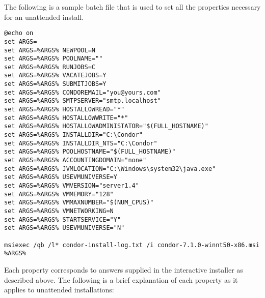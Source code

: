 The following is a sample batch file that is used to set all the
properties necessary for an unattended install.

\begin{verbatim}
@echo on
set ARGS=
set ARGS=%ARGS% NEWPOOL=N
set ARGS=%ARGS% POOLNAME=""
set ARGS=%ARGS% RUNJOBS=C
set ARGS=%ARGS% VACATEJOBS=Y
set ARGS=%ARGS% SUBMITJOBS=Y
set ARGS=%ARGS% CONDOREMAIL="you@yours.com"
set ARGS=%ARGS% SMTPSERVER="smtp.localhost"
set ARGS=%ARGS% HOSTALLOWREAD="*"
set ARGS=%ARGS% HOSTALLOWWRITE="*"
set ARGS=%ARGS% HOSTALLOWADMINISTATOR="$(FULL_HOSTNAME)"
set ARGS=%ARGS% INSTALLDIR="C:\Condor"
set ARGS=%ARGS% INSTALLDIR_NTS="C:\Condor"
set ARGS=%ARGS% POOLHOSTNAME="$(FULL_HOSTNAME)"
set ARGS=%ARGS% ACCOUNTINGDOMAIN="none"
set ARGS=%ARGS% JVMLOCATION="C:\Windows\system32\java.exe"
set ARGS=%ARGS% USEVMUNIVERSE=Y
set ARGS=%ARGS% VMVERSION="server1.4"
set ARGS=%ARGS% VMMEMORY="128"
set ARGS=%ARGS% VMMAXNUMBER="$(NUM_CPUS)"
set ARGS=%ARGS% VMNETWORKING=N
set ARGS=%ARGS% STARTSERVICE="Y"
set ARGS=%ARGS% USEVMUNIVERSE="N"

msiexec /qb /l* condor-install-log.txt /i condor-7.1.0-winnt50-x86.msi %ARGS%
\end{verbatim}

Each property corresponds to answers supplied in the interactive installer
as described above. The following is a brief explanation of each property
as it applies to unattended installations:

